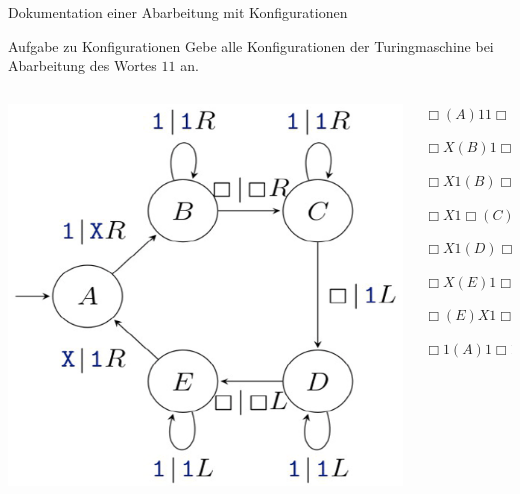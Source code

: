\begin{frame}{Dokumentation einer Abarbeitung mit Konfigurationen}
	
	\begin{taskblock}{Aufgabe zu Konfigurationen}
		Gebe alle Konfigurationen der Turingmaschine bei Abarbeitung des Wortes $11$ an.
	\end{taskblock}

	\begin{columns}
		\begin{column}{0.25\textwidth}
			\includegraphics[scale=0.3]{images/turingmaschine_1k.png}
		\end{column}
		
		\begin{column}{0.37\textwidth}
			\begin{description}
				\pause\item[] $\Box (A)11 \Box$
				\pause\item[$\rightarrow$] $\Box X(B)1 \Box$
				\pause\item[$\rightarrow$] $\Box X1(B) \Box$
				\pause\item[$\rightarrow$] $\Box X1 \Box (C) \Box$
				\pause\item[$\rightarrow$] $\Box X1 (D) \Box 1\Box$
				\pause\item[$\rightarrow$] $\Box X (E) 1 \Box 1\Box$
				\pause\item[$\rightarrow$] $\Box (E) X 1 \Box 1\Box$
				\pause\item[$\rightarrow$] $\Box 1 (A) 1 \Box 1\Box$
			\end{description}
		\end{column}
	

\end{columns}
\end{frame}
